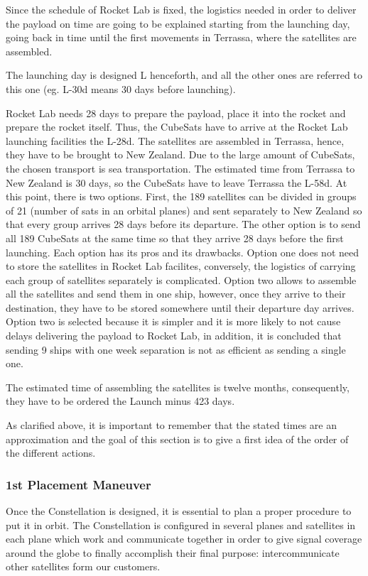 Since the schedule of Rocket Lab is fixed, the logistics needed in order to deliver the payload on time are going to be explained starting from the launching day, going back in time until the first movements in Terrassa, where the satellites are assembled. 

The launching day is designed L henceforth, and all the other ones are referred to this one (eg. L-30d means 30 days before launching). 

Rocket Lab needs 28 days to prepare the payload, place it into the rocket and prepare the rocket itself. Thus, the CubeSats have to arrive at the Rocket Lab launching facilities the L-28d. The satellites are assembled in Terrassa, hence, they have to be brought to New Zealand. Due to the large amount of CubeSats, the chosen transport is sea transportation. The estimated time from Terrassa to New Zealand is 30 days, so the CubeSats have to leave Terrassa the L-58d. At this point, there is two options. First, the 189 satellites can be divided in groups of 21 (number of sats in an orbital planes) and sent separately to New Zealand so that every group arrives 28 days before its departure. The other option is to send all 189 CubeSats at the same time so that they arrive 28 days before the first launching. Each option has its pros and its drawbacks. Option one does not need to store the satellites in Rocket Lab facilites, conversely, the logistics of carrying each group of satellites separately is complicated. Option two allows to assemble all the satellites and send them in one ship, however, once they arrive to their destination, they have to be stored somewhere until their departure day arrives. Option two is selected because it is simpler and it is more likely to not cause delays delivering the payload to Rocket Lab, in addition, it is concluded that sending 9 ships with one week separation is not as efficient as sending a single one. 

The estimated time of assembling the satellites is twelve months, consequently, they have to be ordered the Launch minus 423 days. 

As clarified above, it is important to remember that the stated times are an approximation and the goal of this section is to give a first idea of the order of the different actions. 

\subsubsection{1st Placement Maneuver}
Once the Constellation is designed, it is essential to plan a proper procedure to put it in orbit. The Constellation is configured in several planes and satellites in each plane which work and communicate together in order to give signal coverage around the globe to finally accomplish their final purpose: intercommunicate other satellites form our customers.

